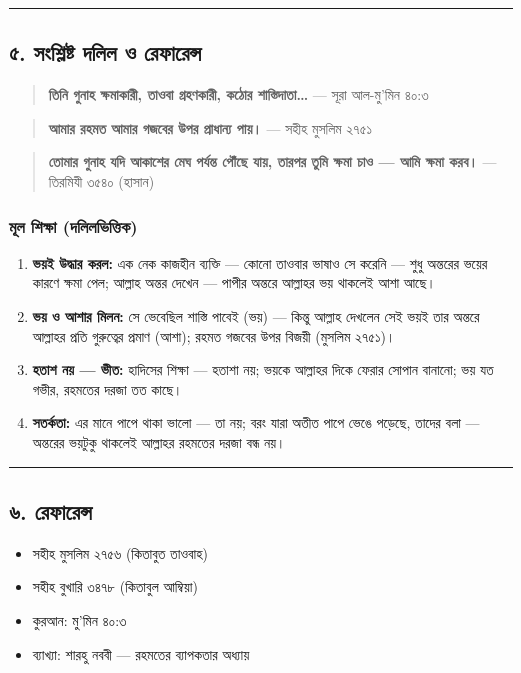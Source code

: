 \medskip\hrule\medskip

\subsection*{৫. সংশ্লিষ্ট দলিল ও রেফারেন্স}

\begin{quote}
\textbf{তিনি গুনাহ ক্ষমাকারী, তাওবা গ্রহণকারী, কঠোর শাস্তিদাতা…} — সূরা আল-মু'মিন ৪০:৩
\end{quote}

\begin{quote}
\textbf{আমার রহমত আমার গজবের উপর প্রাধান্য পায়।} — সহীহ মুসলিম ২৭৫১
\end{quote}

\begin{quote}
\textbf{তোমার গুনাহ যদি আকাশের মেঘ পর্যন্ত পৌঁছে যায়, তারপর তুমি ক্ষমা চাও — আমি ক্ষমা করব।} — তিরমিযী ৩৫৪০ (হাসান)
\end{quote}

\subsubsection*{মূল শিক্ষা (দলিলভিত্তিক)}

\begin{enumerate}
\item \textbf{ভয়ই উদ্ধার করল:} এক নেক কাজহীন ব্যক্তি — কোনো তাওবার ভাষাও সে করেনি — শুধু অন্তরের ভয়ের কারণে ক্ষমা পেল; আল্লাহ অন্তর দেখেন — পাপীর অন্তরে আল্লাহর ভয় থাকলেই আশা আছে।
\item \textbf{ভয় ও আশার মিলন:} সে ভেবেছিল শাস্তি পাবেই (ভয়) — কিন্তু আল্লাহ দেখলেন সেই ভয়ই তার অন্তরে আল্লাহর প্রতি গুরুত্বের প্রমাণ (আশা); রহমত গজবের উপর বিজয়ী (মুসলিম ২৭৫১)।
\item \textbf{হতাশ নয় — ভীত:} হাদিসের শিক্ষা — হতাশা নয়; ভয়কে আল্লাহর দিকে ফেরার সোপান বানানো; ভয় যত গভীর, রহমতের দরজা তত কাছে।
\item \textbf{সতর্কতা:} এর মানে পাপে থাকা ভালো — তা নয়; বরং যারা অতীত পাপে ভেঙে পড়েছে, তাদের বলা — অন্তরের ভয়টুকু থাকলেই আল্লাহর রহমতের দরজা বন্ধ নয়।
\end{enumerate}
\medskip\hrule\medskip

\subsection*{৬. রেফারেন্স}

\begin{itemize}
\item সহীহ মুসলিম ২৭৫৬ (কিতাবুত তাওবাহ)
\item সহীহ বুখারি ৩৪৭৮ (কিতাবুল আম্বিয়া)
\item কুরআন: মু'মিন ৪০:৩
\item ব্যাখ্যা: শারহু নববী — রহমতের ব্যাপকতার অধ্যায়
\end{itemize}


